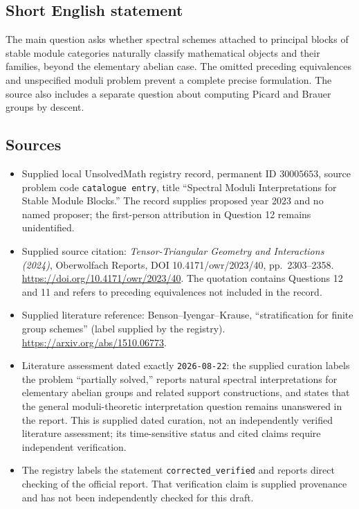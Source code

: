 \documentclass[11pt]{article}
\begin{document}
\subsection{Short English statement}
The main question asks whether spectral schemes attached to principal blocks of stable module categories naturally classify mathematical objects and their families, beyond the elementary abelian case. The omitted preceding equivalences and unspecified moduli problem prevent a complete precise formulation. The source also includes a separate question about computing Picard and Brauer groups by descent.
\subsection{Sources}
\begin{itemize}
\item Supplied local UnsolvedMath registry record, permanent ID \(30005653\), source problem code \texttt{catalogue entry}, title ``Spectral Moduli Interpretations for Stable Module Blocks.'' The record supplies proposed year 2023 and no named proposer; the first-person attribution in Question 12 remains unidentified.
\item Supplied source citation: \emph{Tensor-Triangular Geometry and Interactions (2024)}, Oberwolfach Reports, DOI 10.4171/owr/2023/40, pp.~2303--2358. \url{https://doi.org/10.4171/owr/2023/40}. The quotation contains Questions 12 and 11 and refers to preceding equivalences not included in the record.
\item Supplied literature reference: Benson--Iyengar--Krause, ``stratification for finite group schemes'' (label supplied by the registry). \url{https://arxiv.org/abs/1510.06773}.
\item Literature assessment dated exactly \texttt{2026-08-22}: the supplied curation labels the problem ``partially solved,'' reports natural spectral interpretations for elementary abelian groups and related support constructions, and states that the general moduli-theoretic interpretation question remains unanswered in the report. This is supplied dated curation, not an independently verified literature assessment; its time-sensitive status and cited claims require independent verification.
\item The registry labels the statement \texttt{corrected\_verified} and reports direct checking of the official report. That verification claim is supplied provenance and has not been independently checked for this draft.
\end{itemize}
\end{document}
